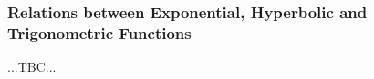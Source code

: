 















\subsubsection{Relations between Exponential, Hyperbolic and Trigonometric Functions}

...TBC...





